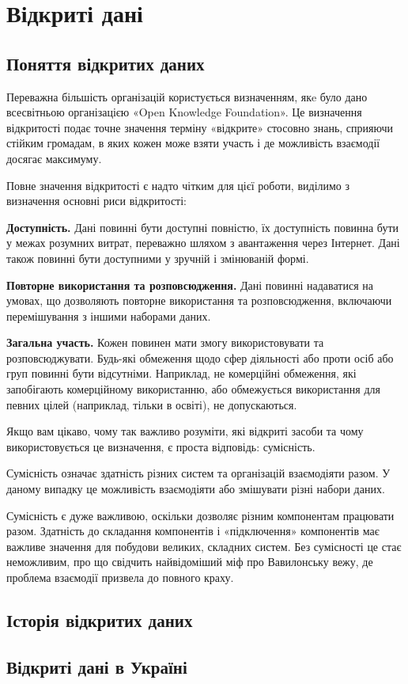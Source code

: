 \chapter{Відкриті дані}

\section{Поняття відкритих даних}


Переважна більшість організацій користується визначенням, якe було дано всесвітньою організацією «Open Knowledge Foundation».
Це визначення відкритості подає точне значення терміну «відкрите» стосовно знань,
сприяючи стійким громадам, в яких кожен може взяти участь
і де можливість взаємодії досягає максимуму.



Повне значення відкритості є надто чітким для цієї роботи,
виділимо з визначення основні риси відкритості:


\textbf{Доступність.}
Дані повинні бути доступні повністю, їх доступність повинна бути
у межах розумних витрат, переважно шляхом з авантаження через Інтернет.
Дані також повинні бути доступними у зручній і змінюваній формі.

\textbf{Повторне використання та розповсюдження.}
Дані повинні надаватися на умовах, що дозволяють повторне
використання та розповсюдження, включаючи
перемішування з іншими наборами даних.

\textbf{Загальна участь.}
Кожен повинен мати змогу використовувати та розповсюджувати.
Будь-які обмеження щодо сфер діяльності або проти осіб або груп повинні бути відсутніми.
Наприклад, не комерційні обмеження, які запобігають комерційному використанню,
або обмежується використання для певних цілей (наприклад, тільки в освіті), не допускаються.

Якщо вам цікаво, чому так важливо розуміти,
які відкриті засоби та чому використовується це визначення, є проста відповідь: сумісність.

Сумісність означає здатність різних систем та організацій взаємодіяти разом.
У даному випадку це можливість взаємодіяти або змішувати різні набори даних.

Сумісність є дуже важливою, оскільки дозволяє різним компонентам працювати разом.
Здатність до складання компонентів і «підключення» компонентів має важливе
значення для побудови великих, складних систем.
Без сумісності це стає неможливим, про що свідчить найвідоміший міф про
Вавилонську вежу, де проблема взаємодії призвела до повного краху.

\section{Історія відкритих даних}

\section{Відкриті дані в Україні}
